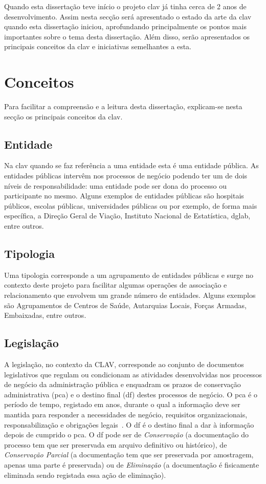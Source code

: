 Quando esta dissertação teve início o projeto \acrshort{clav} já tinha cerca de 2 anos de 
desenvolvimento. Assim nesta secção será apresentado o estado da arte da 
\acrshort{clav} quando esta dissertação iniciou, aprofundando principalmente os pontos mais 
importantes sobre o tema desta dissertação. Além disso, serão apresentados os principais 
conceitos da \acrshort{clav} e iniciativas semelhantes a esta.

\section{Conceitos}

Para facilitar a compreensão e a leitura desta dissertação, explicam-se nesta secção os 
principais conceitos da \acrshort{clav}.

\subsection{Entidade}
Na \acrshort{clav} quando se faz referência a uma entidade esta é uma entidade pública. 
As entidades públicas intervêm nos processos de negócio podendo ter um de dois níveis de 
responsabilidade: uma entidade pode ser dona do processo ou participante no mesmo. 
Alguns exemplos de entidades públicas são hospitais públicos, escolas públicas, 
universidades públicas ou por exemplo, de forma mais específica, a Direção Geral de Viação, 
Instituto Nacional de Estatística, \acrlong{dglab}, entre outros.

\subsection{Tipologia}
Uma tipologia corresponde a um agrupamento de entidades públicas e surge no contexto deste projeto 
para facilitar algumas operações de associação e relacionamento que envolvem um grande número de entidades. 
Alguns exemplos são Agrupamentos de Centros de Saúde, Autarquias Locais, Forças Armadas, Embaixadas, entre outros.

\subsection{Legislação}
A legislação, no contexto da CLAV, corresponde ao conjunto de documentos legislativos que regulam ou condicionam as 
atividades desenvolvidas nos processos de negócio da administração pública e enquadram os prazos de conservação 
administrativa (\acrshort{pca}) e o destino final (\acrshort{df}) destes processos de negócio. 
O \acrshort{pca} é o período de tempo, registado em anos, durante o qual a informação deve ser mantida para 
responder a necessidades  de  negócio,  requisitos  organizacionais,  responsabilização  e obrigações 
legais~\cite{pca}. O \acrshort{df} é o destino final a dar à informação depois de cumprido o \acrshort{pca}. 
O \acrshort{df} pode ser de \emph{Conservação} (a documentação do processo tem que ser preservada em arquivo definitivo
ou histórico), de \emph{Conservação Parcial} (a documentação tem que ser preservada por amostragem, apenas uma
parte é preservada) ou de \emph{Eliminação} (a documentação é fisicamente eliminada sendo registada essa ação de 
eliminação).

